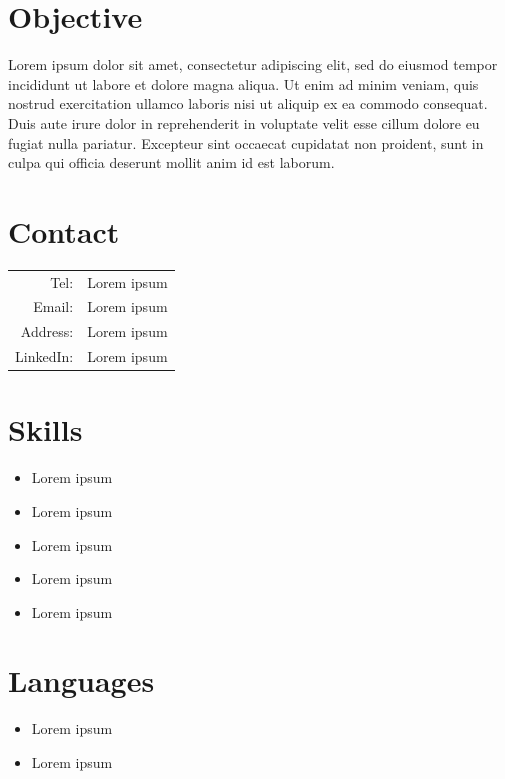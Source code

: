 \documentclass[11pt, oneside, letterpaper, titlepage]{article}
\begin{document}
\begin{tcolorbox}
	\begin{minipage}[t]{3in}
		\vspace*{-0.2in}
		\begin{tcolorbox}[grow to left by=0.25in,colframe=secondary,colback=secondary,arc=0mm]
			\section*{Objective}
				Lorem ipsum dolor sit amet, consectetur adipiscing elit, sed do eiusmod tempor incididunt ut labore et dolore magna aliqua. Ut enim ad minim veniam, quis nostrud exercitation ullamco laboris nisi ut aliquip ex ea commodo consequat. Duis aute irure dolor in reprehenderit in voluptate velit esse cillum dolore eu fugiat nulla pariatur. Excepteur sint occaecat cupidatat non proident, sunt in culpa qui officia deserunt mollit anim id est laborum.   		
			\section*{Contact}
			\begin{tabular}{r l}
				Tel: & Lorem ipsum \\
				Email: & Lorem ipsum \\
				Address: & Lorem ipsum \\
				LinkedIn: & Lorem ipsum \\		
			\end{tabular}
			\section*{Skills}
			\begin{itemize}
				\item{Lorem ipsum}
				\item{Lorem ipsum}
				\item{Lorem ipsum}
				\item{Lorem ipsum}
				\item{Lorem ipsum}
			\end{itemize}
			\section*{Languages}
			\begin{itemize}
				\item{Lorem ipsum}
				\item{Lorem ipsum}
			\end{itemize}
		\end{tcolorbox}
	\end{minipage}
	\begin{minipage}[t]{5.5in}
		\vspace*{-0.2in}
		\begin{tcolorbox}[grow to right by=0.01in,colframe=white,colback=white,arc=0mm]

\end{tcolorbox}
\end{minipage}
\end{tcolorbox}
\end{document}
